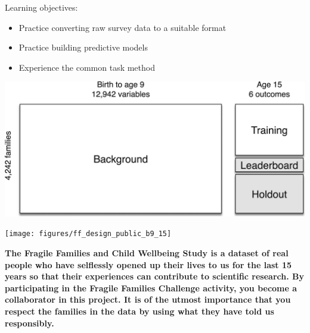 \documentclass[aspectratio=169]{beamer}
\begin{document}
\frame{\titlepage}
\begin{frame}

Learning objectives: \pause
\begin{itemize}
\item Practice converting raw survey data to a suitable format \pause
\item Practice building predictive models \pause
\item Experience the common task method
\end{itemize}

\end{frame}
\begin{frame}

\begin{center}
\includegraphics[width=\textwidth]{figures/salganik_measuring_2020_fig2}
\end{center}

\end{frame}
\begin{frame}

\begin{center}
\texttt{[image: figures/ff\_design\_public\_b9\_15]}
\end{center}

\end{frame}
\begin{frame}

\textbf{The Fragile Families and Child Wellbeing Study is a dataset of real people who have selflessly opened up their lives to us for the last 15 years so that their experiences can contribute to scientific research. By participating in the Fragile Families Challenge activity, you become a collaborator in this project. It is of the utmost importance that you respect the families in the data by using what they have told us responsibly.}

\end{frame}
\end{document}
